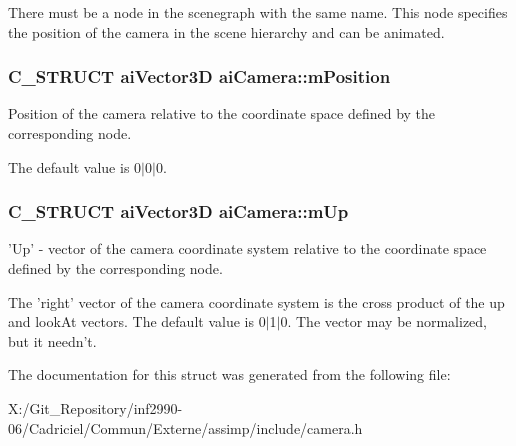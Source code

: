 There must be a node in the scenegraph with the same name. This node specifies the position of the camera in the scene hierarchy and can be animated. \hypertarget{structai_camera_a518617ea192ca0698e748a4399e7c3a5}{
\subsubsection[{m\-Position}]{\setlength{\rightskip}{0pt plus 5cm}C\-\_\-\-S\-T\-R\-U\-C\-T {\bf ai\-Vector3\-D} ai\-Camera\-::m\-Position}}\label{structai_camera_a518617ea192ca0698e748a4399e7c3a5}
Position of the camera relative to the coordinate space defined by the corresponding node.

The default value is 0$\vert$0$\vert$0. \hypertarget{structai_camera_a7fb42b287389b4f99c883098268d6d1a}{
\subsubsection[{m\-Up}]{\setlength{\rightskip}{0pt plus 5cm}C\-\_\-\-S\-T\-R\-U\-C\-T {\bf ai\-Vector3\-D} ai\-Camera\-::m\-Up}}\label{structai_camera_a7fb42b287389b4f99c883098268d6d1a}
'Up' -\/ vector of the camera coordinate system relative to the coordinate space defined by the corresponding node.

The 'right' vector of the camera coordinate system is the cross product of the up and look\-At vectors. The default value is 0$\vert$1$\vert$0. The vector may be normalized, but it needn't. 

The documentation for this struct was generated from the following file\-:\begin{DoxyCompactItemize}
\item 
X\-:/\-Git\-\_\-\-Repository/inf2990-\/06/\-Cadriciel/\-Commun/\-Externe/assimp/include/camera.\-h\end{DoxyCompactItemize}
